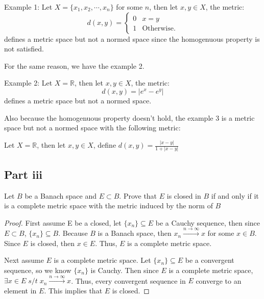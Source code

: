 \begin{answer}
    Example 1: Let $X = \{x_1,x_2, \cdots, x_n\}$ for some $n$, then let $x,y \in X$, the metric:
    \begin{equation}
        d(x,y) = 
        \begin{cases}
            0 & x = y\\
            1 & \text{Otherwise.}
        \end{cases}
    \end{equation}
    defines a metric space but not a normed space since the homogenuous property is not satisfied.
    
    For the same reason, we have the example 2.
    
    Example 2: 
    Let $X = \mathbb{R}$, then let $x,y \in X$, the metric:
    \begin{equation}
        d(x,y) = \left|e^x-e^y\right|
    \end{equation}
    defines a metric space but not a normed space.
    
    Also because the homogenuous property doesn't hold, the example 3 is a metric space but not a normed space with the following metric:
    
    Let $X = \mathbb{R}$, then let $x,y \in X$, define $d(x, y)=\frac{|x-y|}{1+|x-y|}$
\end{answer}

\subsection{Part iii}

\begin{question}
   Let $B$ be a Banach space and $E \subset B$. Prove that $E$ is closed in $B$ if and only if it is a complete metric space with the metric induced by the norm of $B$
\end{question}

\begin{answer}
    \begin{proof}
        First assume E be a closed, let $\{x_n\} \subseteq E$ be a Cauchy sequence, then since $E \subset B$, $\{x_n\} \subseteq B$. Because $B$ is a Banach space, then $x_n \xrightarrow{n \to \infty} x$ for some $x \in B$. Since $E$ is closed, then $x \in E$. Thus, $E$ is a complete metric space.
    
        Next assume $E$ is a complete metric space. Let $\{x_n\} \subseteq E$ be a convergent sequence, so we know $\{x_n\}$ is Cauchy. Then since $E$ is a complete metric space, $\exists x \in E \; s/t \; x_n \xrightarrow{n \to \infty} x$. Thus, every convergent sequence in $E$ converge to an element in $E$. This implies that $E$ is closed.
    \end{proof}
\end{answer}
